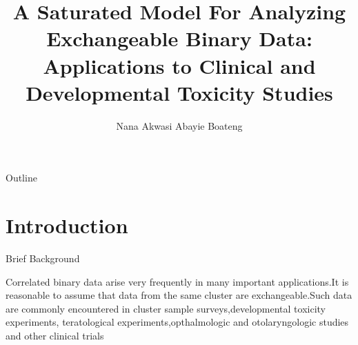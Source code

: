 \documentclass{beamer}
\title[]
{%
    A Saturated Model For Analyzing Exchangeable Binary Data:
 Applications to Clinical and Developmental Toxicity Studies%
}
\author[Nana Akwasi Abayie Boateng]
{
  \textcolor{green!50!black}{Nana Akwasi Abayie Boateng}\inst{}
}
\institute[MTSU] {
  \inst{}%
  The University of Memphis
}
\date[November 28, 2012]
\begin{document}

\begin{frame}{Outline}
\end{frame}

\section{Introduction}

\begin{frame}[t]{Brief Background}

Correlated binary data arise very frequently in many important
applications.It is reasonable to assume that data from the same
cluster are exchangeable.Such data are commonly encountered in
cluster sample surveys,developmental  toxicity experiments,
teratological experiments,opthalmologic and otolaryngologic studies
and other clinical trials

\end{frame}
\begin{frame}


\end{frame}
\end{document}
